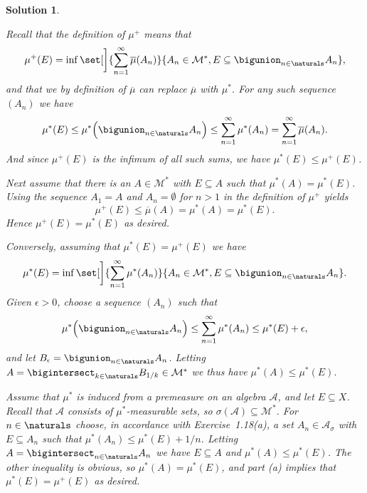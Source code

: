 \documentclass[article, a4paper, 11pt, oneside]{memoir}
\numberwithin{equation}{chapter}
\newcommand{\calM}{\mathcal{M}}
\newcommand{\calA}{\mathcal{A}}
\theoremstyle{nonumberplain}
\newtheorem{solution}{Solution}
\begin{document}
\begin{solution}
\begin{solutionsec}
    \item Recall that the definition of $\mu^+$ means that
    \begin{equation*}
        \mu^+(E)
            = \inf \set[\bigg]{ \sum_{n=1}^\infty \overline\mu(A_n) }{ A_n \in \calM^*, E \subseteq \bigunion_{n\in\naturals} A_n },
    \end{equation*}
    and that we by definition of $\overline\mu$ can replace $\overline\mu$ with $\mu^*$. For any such sequence $(A_n)$ we have
    \begin{equation*}
        \mu^*(E)
            \leq \mu^* \Bigl( \bigunion_{n\in\naturals} A_n \Bigr)
            \leq \sum_{n=1}^\infty \mu^*(A_n)
            = \sum_{n=1}^\infty \overline\mu(A_n).
    \end{equation*}
    And since $\mu^+(E)$ is the infimum of all such sums, we have $\mu^*(E) \leq \mu^+(E)$.

    Next assume that there is an $A \in \calM^*$ with $E \subseteq A$ such that $\mu^*(A) = \mu^*(E)$. Using the sequence $A_1 = A$ and $A_n = \emptyset$ for $n > 1$ in the definition of $\mu^+$ yields
    \begin{equation*}
        \mu^+(E)
            \leq \overline\mu(A)
            = \mu^*(A)
            = \mu^*(E).
    \end{equation*}
    Hence $\mu^+(E) = \mu^*(E)$ as desired.

    Conversely, assuming that $\mu^*(E) = \mu^+(E)$ we have
    \begin{equation*}
        \mu^*(E)
            = \inf \set[\bigg]{ \sum_{n=1}^\infty \mu^*(A_n) }{ A_n \in \calM^*, E \subseteq \bigunion_{n\in\naturals} A_n }.
    \end{equation*}
    Given $\epsilon > 0$, choose a sequence $(A_n)$ such that
    \begin{equation*}
        \mu^* \Bigl( \bigunion_{n\in\naturals} A_n \Bigr)
            \leq \sum_{n=1}^\infty \mu^*(A_n)
            \leq \mu^*(E) + \epsilon,
    \end{equation*}
    and let $B_\epsilon = \bigunion_{n\in\naturals} A_n$. Letting $A = \bigintersect_{k\in\naturals} B_{1/k} \in \calM^*$ we thus have $\mu^*(A) \leq \mu^*(E)$.

    \item Assume that $\mu^*$ is induced from a premeasure on an algebra $\calA$, and let $E \subseteq X$. Recall that $\calA$ consists of $\mu^*$-measurable sets, so $\sigma(\calA) \subseteq \calM^*$. For $n \in \naturals$ choose, in accordance with Exercise~1.18(a), a set $A_n \in \calA_\sigma$ with $E \subseteq A_n$ such that $\mu^*(A_n) \leq \mu^*(E) + 1/n$. Letting $A = \bigintersect_{n\in\naturals} A_n$ we have $E \subseteq A$ and $\mu^*(A) \leq \mu^*(E)$. The other inequality is obvious, so $\mu^*(A) = \mu^*(E)$, and part (a) implies that $\mu^*(E) = \mu^+(E)$ as desired.
\end{solutionsec}
\end{solution}
\end{document}
